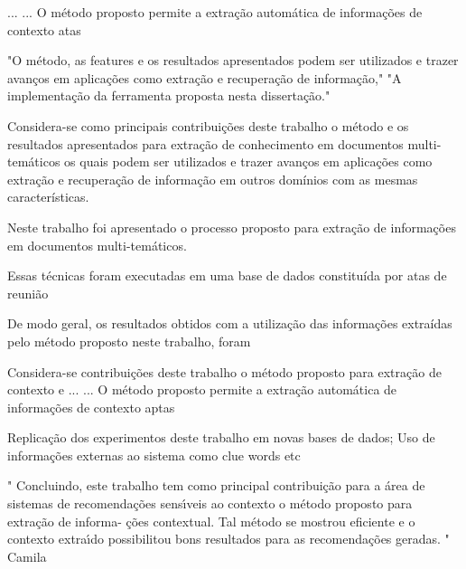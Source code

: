 ...
...
O método proposto permite a extração automática de informações de contexto atas



	"O método, as features e os resultados apresentados podem ser utilizados e trazer avanços em aplicações como extração e recuperação de informação,"
	"A implementação da ferramenta proposta nesta dissertação."







	Considera-se como principais contribuições deste trabalho o método e os resultados apresentados para extração de conhecimento em documentos multi-temáticos os quais podem ser utilizados e trazer avanços em aplicações como extração e recuperação de informação em outros domínios com as mesmas características.


















Neste trabalho foi apresentado o processo proposto para extração de informações em documentos multi-temáticos.


Essas técnicas foram executadas em uma base de dados constituída por atas de reunião



De modo geral, os resultados obtidos com a utilização das informações extraídas pelo método
proposto neste trabalho, foram 



Considera-se contribuições deste trabalho o método proposto para extração de contexto e
...
...
O método proposto permite a extração automática de informações de contexto aptas


 Replicação dos experimentos deste trabalho em novas bases de dados;
 Uso de informações externas ao sistema como clue words etc




" Concluindo, este trabalho tem como principal contribuição para a área de sistemas de recomendações sensı́veis ao contexto o método proposto para extração de informa- ções contextual. Tal método se mostrou eficiente e o contexto extraı́do possibilitou bons resultados para as recomendações geradas. "
Camila


